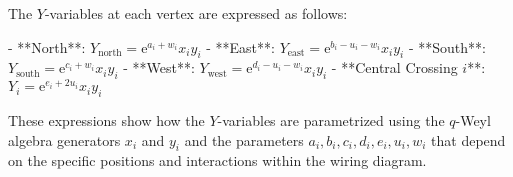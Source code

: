 The \( Y \)-variables at each vertex are expressed as follows:

- **North**: \( Y_{\text{north}} = \mathrm{e}^{a_i + w_i} x_i y_i \)
- **East**: \( Y_{\text{east}} = \mathrm{e}^{b_i - u_i - w_i} x_i y_i \)
- **South**: \( Y_{\text{south}} = \mathrm{e}^{c_i + w_i} x_i y_i \)
- **West**: \( Y_{\text{west}} = \mathrm{e}^{d_i - u_i - w_i} x_i y_i \)
- **Central Crossing \( i \)**: \( Y_i = \mathrm{e}^{e_i + 2u_i} x_i y_i \)

These expressions show how the \( Y \)-variables are parametrized using the \( q \)-Weyl algebra generators \( x_i \) and \( y_i \) and the parameters \( a_i, b_i, c_i, d_i, e_i, u_i, w_i \) that depend on the specific positions and interactions within the wiring diagram.